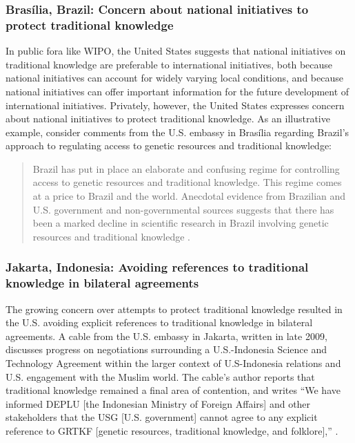 \documentclass[12pt]{article}
\begin{document}
\subsubsection*{Bras\'ilia, Brazil: Concern about national initiatives to protect traditional knowledge}
In public fora like WIPO, the United States suggests that national initiatives on traditional knowledge 
are preferable to international initiatives, both because national initiatives can account for 
widely varying local conditions, and because national initiatives can offer important information for 
the future development of international initiatives. Privately, however, the United States expresses 
concern about national initiatives to protect traditional knowledge. As an illustrative example, 
consider comments from the U.S. embassy in Bras\'ilia regarding Brazil's approach to regulating access 
to genetic resources and traditional knowledge:
\begin{quote}
Brazil has put in place an elaborate and confusing regime for 
controlling access to genetic resources and traditional knowledge. 
This regime comes at a price to Brazil and the world.  Anecdotal 
evidence from Brazilian and U.S. government and non-governmental 
sources suggests that there has been a marked decline in scientific 
research in Brazil involving genetic resources and traditional 
knowledge \citep{u.s._department_of_state2009brazils}.
\end{quote}

\subsubsection*{Jakarta, Indonesia: Avoiding references to traditional knowledge in bilateral agreements}
The growing concern over attempts to protect traditional knowledge resulted 
in the U.S. avoiding explicit references to traditional 
knowledge in 
bilateral agreements.
A cable from the U.S. embassy in Jakarta, written in 
late 2009, discusses progress on negotiations surrounding a U.S.-Indonesia Science and Technology 
Agreement within the larger context of U.S-Indonesia relations and U.S. engagement with the Muslim 
world. The cable's author reports that traditional knowledge remained a final area of contention, and 
writes ``We have informed DEPLU [the Indonesian Ministry of Foreign Affairs] and other
stakeholders that the USG [U.S. government] cannot agree to any explicit reference to
GRTKF [genetic resources, traditional knowledge, and 
folklore],'' \citep{u.s._department_of_state2009indonesia}.
\end{document}
